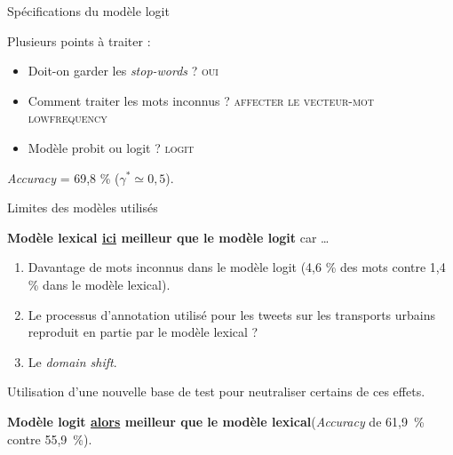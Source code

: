 \documentclass[10pt,xcolor=table,color={dvipsnames,usenames},ignorenonframetext,usepdftitle=false,french]{beamer}
\providecommand{\tightlist}{%
  \setlength{\parskip}{0pt}
  }
\begin{document}
\begin{frame}{Spécifications du modèle logit}
\protect\hypertarget{spuxe9cifications-du-moduxe8le-logit}{}

Plusieurs points à traiter :

\begin{itemize}
\item
  Doit-on garder les \emph{stop-words} ? \textsc{oui}
\item
  Comment traiter les mots inconnus ?
  \textsc{affecter le vecteur-mot lowfrequency}
\item
  Modèle probit ou logit ? \textsc{logit}
\end{itemize}

\bigskip

\bigskip

\faArrowCircleRight{} \emph{Accuracy} = 69,8 \%
(\(\gamma^* \simeq 0,5\)).

\end{frame}

\begin{frame}{Limites des modèles utilisés}
\protect\hypertarget{limites-des-moduxe8les-utilisuxe9s}{}

\textbf{Modèle lexical \underline{ici} meilleur que le modèle logit} car
\dots

\begin{enumerate}
\tightlist
\item
  Davantage de mots inconnus dans le modèle logit (4,6 \% des mots
  contre 1,4 \% dans le modèle lexical).
\end{enumerate}

\pause

\begin{enumerate}
\setcounter{enumi}{1}
\tightlist
\item
  Le processus d'annotation utilisé pour les tweets sur les transports
  urbains reproduit en partie par le modèle lexical ?
\end{enumerate}

\pause

\begin{enumerate}
\setcounter{enumi}{2}
\tightlist
\item
  Le \emph{domain shift}.
\end{enumerate}

\pause

\bigskip

\faArrowCircleRight{} Utilisation d'une nouvelle base de test pour
neutraliser certains de ces effets.

\textbf{Modèle logit \underline{alors} meilleur que le modèle
lexical}\newline(\emph{Accuracy} de 61,9~\% contre 55,9~\%).

\end{frame}
\end{document}
